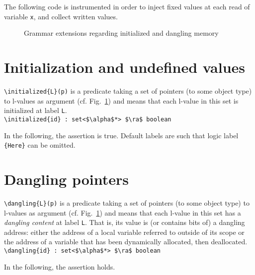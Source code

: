 \begin{example}
  The following code is instrumented in order to inject fixed values
  at each read of variable \lstinline|x|, and collect written values.
\end{example}



\begin{figure}[htp]
  \begin{cadre}
      
    \end{cadre}
  \caption{Grammar extensions regarding initialized and dangling memory}
\label{fig:gram:initialized}
\end{figure}

\section{Initialization and undefined values}
\label{sec:initialized}
\lstinline|\initialized{L}(p)| is a predicate taking a set of pointers
(to some object type) to l-values as
argument (cf. Fig.~\ref{fig:gram:initialized}) and means that each l-value in this set is initialized at label \lstinline|L|.
\\ \makebox[5mm]{} \lstinline|\initialized{id} : set<$\alpha$*> $\ra$ boolean|

\begin{example}
  In the following, the assertion is true.
  Default labels are
  such that logic label \lstinline|{Here}| can be omitted.
\end{example}

\section{Dangling pointers}
\label{sec:dangling_pointers}
\lstinline|\dangling{L}(p)|
is a predicate taking a set of pointers (to some object type) to l-values as
argument (cf. Fig.~\ref{fig:gram:initialized}) and means that each l-value in this set has a \emph{dangling
  content} at label \lstinline|L|. That is, its value is (or contains bits
of) a dangling address: either the address of a local
variable referred to outside of its scope or the address of a variable that
has been dynamically allocated, then deallocated.
\\ \makebox[5mm]{} \lstinline|\dangling{id} : set<$\alpha$*> $\ra$ boolean|

\begin{example}
  In the following, the assertion holds.
\end{example}

